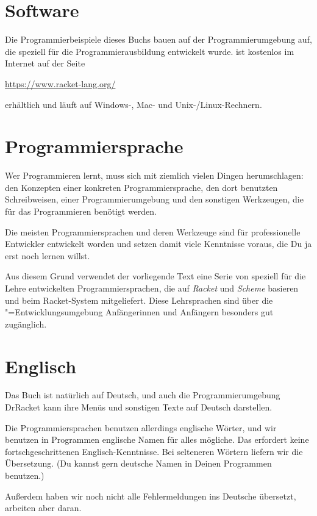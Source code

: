 \section{Software}

Die Programmierbeispiele dieses Buchs bauen auf der
Programmierumgebung \drscheme{}\index{\drscheme{}} auf, die speziell
für die Programmierausbildung entwickelt wurde. 
\drscheme{} ist kostenlos im Internet auf der Seite
%
\begin{center}
  \url{https://www.racket-lang.org/}
\end{center}
%
erhältlich und läuft auf Windows-, Mac- und Unix-/Linux-Rechnern.

\section{Programmiersprache}

Wer Programmieren lernt, muss sich mit ziemlich vielen Dingen
herumschlagen: den Konzepten einer konkreten Programmiersprache, den
dort benutzten Schreibweisen, einer Programmierumgebung und den
sonstigen Werkzeugen, die für das Programmieren benötigt werden.

Die meisten Programmiersprachen und deren Werkzeuge sind für
professionelle Entwickler entwickelt worden und setzen damit viele
Kenntnisse voraus, die Du ja erst noch lernen willst.

Aus diesem Grund verwendet der vorliegende Text eine Serie von
speziell für die Lehre entwickelten Programmiersprachen, die auf
\textit{Racket} und \textit{Scheme}
basieren und beim Racket-System mitgeliefert.
Diese Lehrsprachen sind über die
\drscheme"=Entwicklungsumgebung Anfängerinnen und Anfängern besonders
gut zugänglich.

\section{Englisch}

Das Buch ist natürlich auf Deutsch, und auch die Programmierumgebung
DrRacket kann ihre Menüs und sonstigen Texte auf Deutsch darstellen.

Die Programmiersprachen benutzen allerdings englische Wörter, und wir
benutzen in Programmen englische Namen für alles mögliche.  Das
erfordert keine fortschgeschrittenen Englisch-Kenntnisse.  Bei
selteneren Wörtern liefern wir die Übersetzung.  (Du kannst gern
deutsche Namen in Deinen Programmen benutzen.)

Außerdem haben wir noch nicht alle Fehlermeldungen ins Deutsche
übersetzt, arbeiten aber daran.

